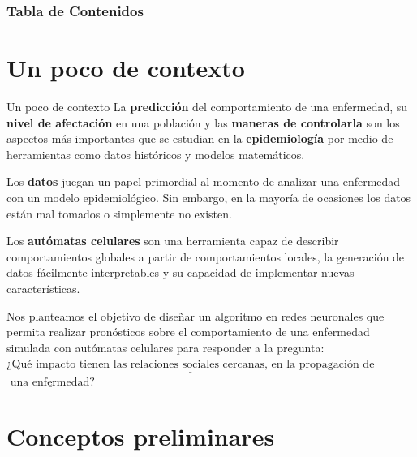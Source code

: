 \documentclass[9pt]{beamer}
\subtitle{\\
\LARGE{Predicción del comportamiento de una enfermedad} \\
\LARGE{simulada en autómatas celulares con un algoritmo}\\
\LARGE{propuesto en redes neuronales}}
\author{Jorge Andres Ibañez Huertas}
\institute{Central University, Bogotá}
\date{\today}
\begin{document}
\titlepage

\begin{frame}
\frametitle{Tabla de Contenidos}
\tableofcontents
\end{frame}

\section{Un poco de contexto}\label{sec:Estudio epidemiológico}
\begin{frame}{Un poco de contexto}
La \textbf{predicción} del comportamiento de una enfermedad, su \textbf{nivel de afectación} en una población y las \textbf{maneras de controlarla} son los aspectos más importantes que se estudian en la \textbf{epidemiología} por medio de herramientas como datos históricos y modelos matemáticos.

Los \textbf{datos} juegan un papel primordial al momento de analizar una enfermedad con un modelo epidemiológico. Sin embargo, en la mayoría de ocasiones los datos están mal tomados o simplemente no existen.

Los \textbf{autómatas celulares} son una herramienta capaz de describir comportamientos globales a partir de comportamientos locales, la generación de datos fácilmente interpretables y su capacidad de implementar nuevas características.

Nos planteamos el objetivo de diseñar un algoritmo en redes neuronales que permita realizar pronósticos sobre el comportamiento de una enfermedad simulada con autómatas celulares para responder a la pregunta: $\underline{\text{¿Qué impacto tienen las relaciones sociales cercanas, en la propagación de}}$ $\underline{\text{ una enfermedad?}}$
\end{frame}

\section{Conceptos preliminares}\label{sec:Modelos epidemiológicos clásicos}
\end{document}
